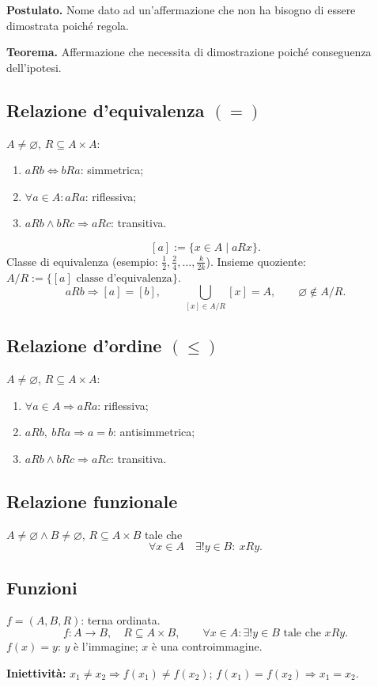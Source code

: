 \documentclass[11pt,a4paper]{article}
\newcommand{\pagina}[1]{\clearpage}
\begin{document}
\textbf{Postulato.} Nome dato ad un'affermazione che non ha bisogno di essere dimostrata poiché regola.

\textbf{Teorema.} Affermazione che necessita di dimostrazione poiché conseguenza dell'ipotesi.

\subsection*{Relazione d'equivalenza $(=)$}
$A\ne\varnothing$, $R\subseteq A\times A$:
\begin{enumerate}
\item $aRb\Longleftrightarrow bRa$: simmetrica;
\item $\forall a\in A: aRa$: riflessiva;
\item $aRb\wedge bRc\Longrightarrow aRc$: transitiva.
\end{enumerate}
\[ [a]:=\{x\in A\mid aRx\}. \]
Classe di equivalenza (esempio: $\frac12,\frac24,\ldots,\frac{k}{2k}$).
Insieme quoziente: $A/R:=\{[a]\text{ classe d'equivalenza}\}$.
\[ aRb\Longrightarrow[a]=[b],\qquad \bigcup_{[x]\in A/R}[x]=A,\qquad \varnothing\notin A/R.\]
\subsection*{Relazione d'ordine $(\le)$}
$A\ne\varnothing$, $R\subseteq A\times A$:
\begin{enumerate}
\item $\forall a\in A\Longrightarrow aRa$: riflessiva;
\item $aRb,\ bRa\Longrightarrow a=b$: antisimmetrica;
\item $aRb\wedge bRc\Longrightarrow aRc$: transitiva.
\end{enumerate}
\pagina{6}
\subsection*{Relazione funzionale}
$A\ne\varnothing\wedge B\ne\varnothing$, $R\subseteq A\times B$ tale che
\[\forall x\in A\quad\exists!y\in B:\ xRy.\]
\subsection*{Funzioni}
$f=(A,B,R)$: terna ordinata.
\[f:A\longrightarrow B,\quad R\subseteq A\times B,\qquad
\forall x\in A:\exists!y\in B\text{ tale che }xRy.\]
$f(x)=y$: $y$ è l'immagine; $x$ è una controimmagine.

\textbf{Iniettività:} $x_1\ne x_2\Longrightarrow f(x_1)\ne f(x_2)$;
$f(x_1)=f(x_2)\Longrightarrow x_1=x_2$.
\end{document}
